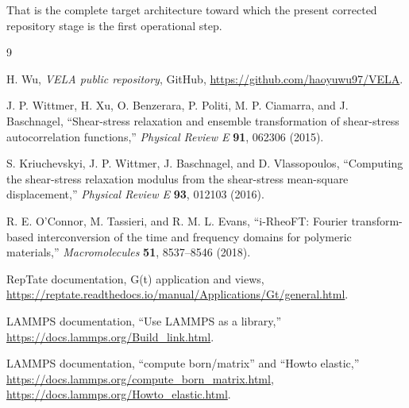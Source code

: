 \documentclass[11pt]{article}
\begin{document}
That is the complete target architecture toward which the present corrected repository stage is the first operational step.

\begin{thebibliography}{9}

H. Wu, \emph{VELA public repository}, GitHub, \url{https://github.com/haoyuwu97/VELA}.

J. P. Wittmer, H. Xu, O. Benzerara, P. Politi, M. P. Ciamarra, and J. Baschnagel,
``Shear-stress relaxation and ensemble transformation of shear-stress autocorrelation functions,''
\emph{Physical Review E} \textbf{91}, 062306 (2015).

S. Kriuchevskyi, J. P. Wittmer, J. Baschnagel, and D. Vlassopoulos,
``Computing the shear-stress relaxation modulus from the shear-stress mean-square displacement,''
\emph{Physical Review E} \textbf{93}, 012103 (2016).

R. E. O'Connor, M. Tassieri, and R. M. L. Evans,
``i-RheoFT: Fourier transform-based interconversion of the time and frequency domains for polymeric materials,''
\emph{Macromolecules} \textbf{51}, 8537--8546 (2018).

RepTate documentation, G(t) application and views,
\url{https://reptate.readthedocs.io/manual/Applications/Gt/general.html}.

LAMMPS documentation, ``Use LAMMPS as a library,''
\url{https://docs.lammps.org/Build_link.html}.

LAMMPS documentation, ``compute born/matrix'' and ``Howto elastic,''
\url{https://docs.lammps.org/compute_born_matrix.html},
\url{https://docs.lammps.org/Howto_elastic.html}.

\end{thebibliography}
\end{document}
